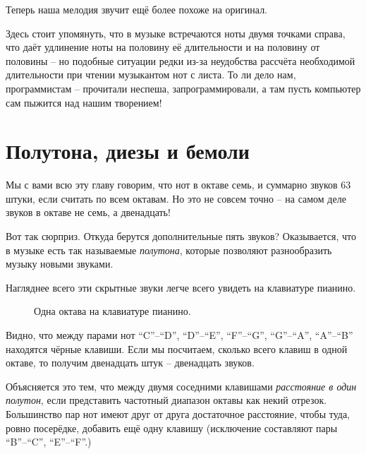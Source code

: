 \documentclass[a4paper,twoside]{book}
\begin{document}
Теперь наша мелодия звучит ещё более похоже на оригинал.

Здесь стоит упомянуть, что в музыке встречаются ноты двумя точками справа, что
даёт удлинение ноты на половину её длительности и на половину от половины -- но
подобные ситуации редки из-за неудобства рассчёта необходимой длительности при
чтении музыкантом нот с листа. То ли дело нам, программистам -- прочитали
неспеша, запрограммировали, а там пусть компьютер сам пыжится над нашим
творением!

\section{Полутона, диезы и бемоли}

Мы с вами всю эту главу говорим, что нот в октаве семь, и суммарно звуков 63
штуки, если считать по всем октавам. Но это не совсем точно -- на самом деле
звуков в октаве не семь, а двенадцать!

Вот так сюрприз. Откуда берутся дополнительные пять звуков? Оказывается, что в
музыке есть так называемые \emph{полутона}, которые позволяют разнообразить
музыку новыми звуками.

Нагляднее всего эти скрытные звуки легче всего увидеть на клавиатуре пианино.

\begin{figure}[ht]
  \caption{Одна октава на клавиатуре пианино.}
  \centering
  \label{fig:lilypond-music-graph-1}
\end{figure}

Видно, что между парами нот ``C''--``D'', ``D''--``E'', ``F''--``G'',
``G''--``A'', ``A''--``B'' находятся чёрные клавиши. Если мы посчитаем, сколько
всего клавиш в одной октаве, то получим двенадцать штук -- двенадцать звуков.

Объясняется это тем, что между двумя соседними клавишами \emph{расстояние в один
полутон}, если представить частотный диапазон октавы как некий отрезок.
Большинство пар нот имеют друг от друга достаточное расстояние, чтобы туда,
ровно посерёдке, добавить ещё одну клавишу (исключение составляют пары
``B''--``C'', ``E''--``F''.)
\end{document}
